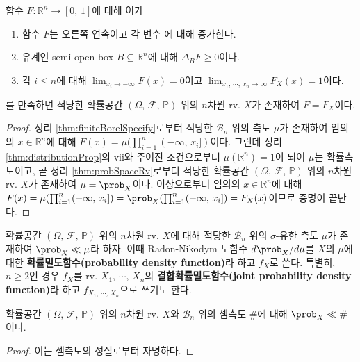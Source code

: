 \begin{theorem}
    함수 $F:\mathbb{R}^n\to[0,\,1]$에 대해 이가
    \begin{enumerate}
        \item 함수 $F$는 오른쪽 연속이고 각 변수 에 대해 증가한다.
        \item 유계인 semi-open box $B\subseteq\mathbb{R}^n$에 대해 $\Delta_BF\geq0$이다.
        \item 각 $i\leq n$에 대해 $\lim_{x_i\to-\infty}F(x)=0$이고 $\lim_{x_1,\,\cdots,\,x_n\to\infty}F_X(x)=1$이다.
    \end{enumerate}
    를 만족하면 적당한 확률공간 $(\Omega,\,\mathcal{F},\,\mathbb{P})$ 위의 $n$차원 rv. $X$가 존재하여 $F=F_X$이다.
\end{theorem}

\begin{proof}
    정리 \ref{thm:finiteBorelSpecify}로부터 적당한 $\mathcal{B}_n$ 위의 측도 $\mu$가 존재하여 임의의 $x\in\mathbb{R}^n$에 대해 $F(x)=\mu(\prod_{i=1}^n(-\infty,\,x_i])$이다. 그런데 정리 \ref{thm:distributionProp}의 vii와 주어진 조건으로부터 $\mu(\mathbb{R}^n)=1$이 되어 $\mu$는 확률측도이고, 곧 정리 \ref{thm:probSpaceRv}로부터 적당한 확률공간 $(\Omega,\,\mathcal{F},\,\mathbb{P})$ 위의 $n$차원 rv. $X$가 존재하여 $\mu=\prob_X$이다. 이상으로부터 임의의 $x\in\mathbb{R}^n$에 대해 $F(x)=\mu(\prod_{i=1}^n(-\infty,\,x_i])=\prob_X(\prod_{i=1}^n(-\infty,\,x_i])=F_X(x)$이므로 증명이 끝난다.
\end{proof}

\begin{definition}
    확률공간 $(\Omega,\,\mathcal{F},\,\mathbb{P})$ 위의 $n$차원 rv. $X$에 대해 적당한 $\mathcal{B}_n$ 위의 $\sigma$-유한 측도 $\mu$가 존재하여 $\prob_X\ll\mu$라 하자. 이때 Radon-Nikodym 도함수 $d\prob_X/d\mu$를 $X$의 $\mu$에 대한 \textbf{확률밀도함수(probability density function)}라 하고 $f_X$로 쓴다. 특별히, $n\geq2$인 경우 $f_X$를 rv. $X_1,\,\cdots,\,X_n$의 \textbf{결합확률밀도함수(joint probability density function)}라 하고 $f_{X_1,\,\cdots,\,X_n}$으로 쓰기도 한다.
\end{definition}

\begin{proposition}
    확률공간 $(\Omega,\,\mathcal{F},\,\mathbb{P})$ 위의 $n$차원 rv. $X$와 $\mathcal{B}_n$ 위의 셈측도 $\#$에 대해 $\prob_X\ll\#$이다.
\end{proposition}

\begin{proof}
    이는 셈측도의 성질로부터 자명하다.
\end{proof}
 
\begin{theorem}
    
\end{theorem}